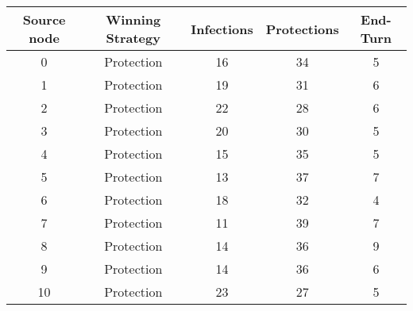 \documentclass[results.tex]{subfiles}
\begin{document}
    \begin{center}
        \begin{tabular}{| c || c | c | c | c |}
            \hline
            {\bfseries Source node} & {\bfseries Winning Strategy} & {\bfseries Infections} & {\bfseries Protections}
            & {\bfseries End-Turn}
            \\  %
            \hline\hline
            0                       & Protection                   & 16                     & 34                      & 5                    \\
            \hline
            1                       & Protection                   & 19                     & 31                      & 6                    \\
            \hline
            2                       & Protection                   & 22                     & 28                      & 6                    \\
            \hline
            3                       & Protection                   & 20                     & 30                      & 5                    \\
            \hline
            4                       & Protection                   & 15                     & 35                      & 5                    \\
            \hline
            5                       & Protection                   & 13                     & 37                      & 7                    \\
            \hline
            6                       & Protection                   & 18                     & 32                      & 4                    \\
            \hline
            7                       & Protection                   & 11                     & 39                      & 7                    \\
            \hline
            8                       & Protection                   & 14                     & 36                      & 9                    \\
            \hline
            9                       & Protection                   & 14                     & 36                      & 6                    \\
            \hline
            10                      & Protection                   & 23                     & 27                      & 5                    \\

\end{tabular}
\end{center}
\end{document}
